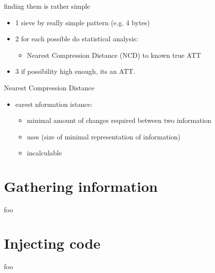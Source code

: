 \documentclass{beamer}
\newenvironment{itemizeframe}[1]
  {\begin{frame}{#1}\startitemizeframe}
  {\stopitemizeframe\end{frame}}
\newcommand\startitemizeframe{\begin{itemize}}
\newcommand\stopitemizeframe{\end{itemize}}
\begin{document}
		\begin{itemizeframe}{finding them is rather simple}
			\item[1] sieve by really simple pattern (e.g. 4 bytes)
			\item[2] for each possible do statistical analysis:
			\begin{itemize}
				\item Nearest Compression Distance (NCD) to known true ATT
			\end{itemize}
			\item[3] if possibility high enough, its an ATT.
		\end{itemizeframe}

		\begin{itemizeframe}{Nearest Compression Distance}
			\item {}earest nformation istance:
			\begin{itemize}
				\item minimal amount of changes required between two information
				\item uses  (size of minimal representation of information)
				\item incalculable
			\end{itemize}
		\end{itemizeframe}

\section{Gathering information}

	\begin{frame}
		foo
	\end{frame}

\section{Injecting code}

	\begin{frame}
		foo
	\end{frame}
\end{document}
